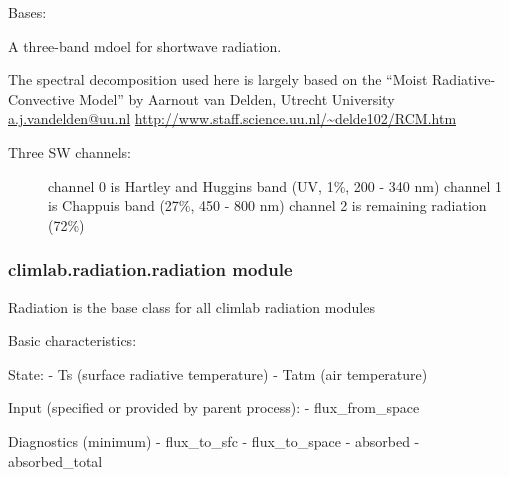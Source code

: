 \documentclass[letterpaper,10pt,english]{sphinxmanual}
\begin{document}
\begin{fulllineitems}
\label{api/climlab.radiation:climlab.radiation.nband.ThreeBandSW}
Bases: {\hyperref[api/climlab.radiation:climlab.radiation.nband.NbandRadiation]{\emph{}}}

A three-band mdoel for shortwave radiation.

The spectral decomposition used here is largely based on the
``Moist Radiative-Convective Model'' by Aarnout van Delden, Utrecht University
\href{mailto:a.j.vandelden@uu.nl}{a.j.vandelden@uu.nl}
\href{http://www.staff.science.uu.nl/~delde102/RCM.htm}{http://www.staff.science.uu.nl/\textasciitilde{}delde102/RCM.htm}
\begin{description}
\item[{Three SW channels:}] \leavevmode
channel 0 is Hartley and Huggins band (UV, 1\%, 200 - 340 nm)
channel 1 is Chappuis band (27\%, 450 - 800 nm)
channel 2 is remaining radiation (72\%)

\end{description}

\begin{fulllineitems}
\label{api/climlab.radiation:climlab.radiation.nband.ThreeBandSW.emissivity}
\end{fulllineitems}


\end{fulllineitems}



\subsubsection{climlab.radiation.radiation module}
\label{api/climlab.radiation:module-climlab.radiation.radiation}\label{api/climlab.radiation:climlab-radiation-radiation-module}
Radiation is the base class for all climlab radiation modules

Basic characteristics:

State:
- Ts (surface radiative temperature)
- Tatm (air temperature)

Input (specified or provided by parent process):
- flux\_from\_space

Diagnostics (minimum)
- flux\_to\_sfc
- flux\_to\_space
- absorbed
- absorbed\_total
\end{document}
